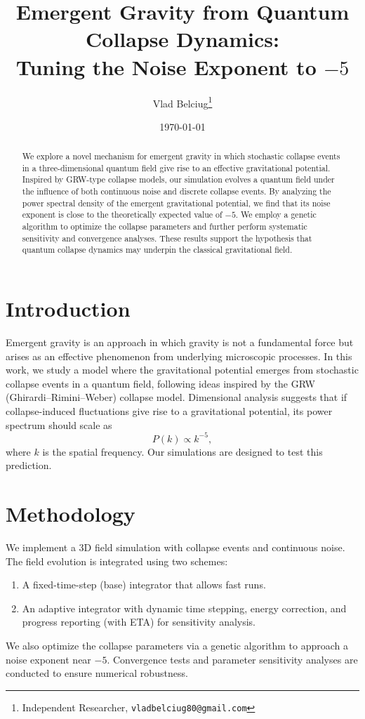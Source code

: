 \documentclass[12pt]{article}
\title{Emergent Gravity from Quantum Collapse Dynamics:\\Tuning the Noise Exponent to \(-5\)}
\author{Vlad Belciug\thanks{Independent Researcher, \texttt{vladbelciug80@gmail.com}}}
\date{\today}
\begin{document}
\maketitle

\begin{abstract}
We explore a novel mechanism for emergent gravity in which stochastic collapse events in a three-dimensional quantum field give rise to an effective gravitational potential. Inspired by GRW-type collapse models, our simulation evolves a quantum field under the influence of both continuous noise and discrete collapse events. By analyzing the power spectral density of the emergent gravitational potential, we find that its noise exponent is close to the theoretically expected value of \(-5\). We employ a genetic algorithm to optimize the collapse parameters and further perform systematic sensitivity and convergence analyses. These results support the hypothesis that quantum collapse dynamics may underpin the classical gravitational field.
\end{abstract}

\section{Introduction}
Emergent gravity is an approach in which gravity is not a fundamental force but arises as an effective phenomenon from underlying microscopic processes. In this work, we study a model where the gravitational potential emerges from stochastic collapse events in a quantum field, following ideas inspired by the GRW (Ghirardi–Rimini–Weber) collapse model. Dimensional analysis suggests that if collapse-induced fluctuations give rise to a gravitational potential, its power spectrum should scale as 
\[
P(k) \propto k^{-5},
\]
where \( k \) is the spatial frequency. Our simulations are designed to test this prediction.

\section{Methodology}
We implement a 3D field simulation with collapse events and continuous noise. The field evolution is integrated using two schemes: 
\begin{enumerate}
    \item A fixed-time-step (base) integrator that allows fast runs.
    \item An adaptive integrator with dynamic time stepping, energy correction, and progress reporting (with ETA) for sensitivity analysis.
\end{enumerate}
We also optimize the collapse parameters via a genetic algorithm to approach a noise exponent near \(-5\). Convergence tests and parameter sensitivity analyses are conducted to ensure numerical robustness.
\end{document}
